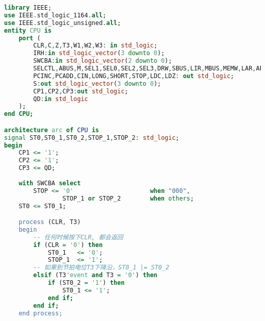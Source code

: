 \documentclass[UTF8]{ctexart}
\begin{document}
{\firacode
\begin{lstlisting}[language={VHDL}]
library IEEE;
use IEEE.std_logic_1164.all;
use IEEE.std_logic_unsigned.all;
entity CPU is
	port (
		CLR,C,Z,T3,W1,W2,W3: in std_logic;
		IRH:in std_logic_vector(3 downto 0);
		SWCBA:in std_logic_vector(2 downto 0);
		SELCTL,ABUS,M,SEL1,SEL0,SEL2,SEL3,DRW,SBUS,LIR,MBUS,MEMW,LAR,ARINC,LPC,
		PCINC,PCADD,CIN,LONG,SHORT,STOP,LDC,LDZ: out std_logic;
		S:out std_logic_vector(3 downto 0);
		CP1,CP2,CP3:out std_logic;	
		QD:in std_logic	
	);
end CPU;

architecture arc of CPU is
signal ST0,ST0_1,ST0_2,STOP_1,STOP_2: std_logic;
begin
	CP1 <= '1';
	CP2 <= '1';
	CP3 <= QD;
	
	with SWCBA select
		STOP <= '0'						when "000",
				STOP_1 or STOP_2 		when others;
	ST0 <= ST0_1;

	process (CLR, T3)
	begin
		-- 任何时候按下CLR, 都会返回
		if (CLR = '0') then
			ST0_1	<= '0';
			STOP_1	<= '1';
		-- 如果到节拍电位T3下降沿，ST0_1 |= ST0_2
		elsif (T3'event and T3 = '0') then
			if (ST0_2 = '1') then
				ST0_1 <= '1';
			end if;
		end if;
	end process;
	

\end{lstlisting}}
\end{document}
